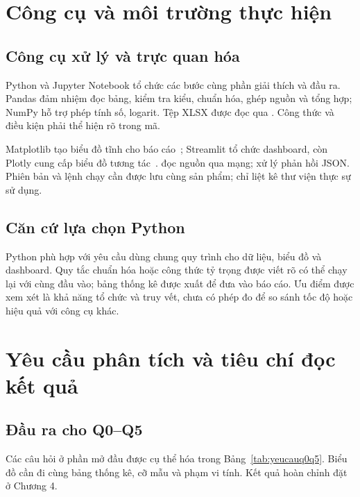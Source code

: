 \documentclass[12pt,a4paper,oneside]{report}
\newcommand{\tenCot}[1]{\texttt{\detokenize{#1}}}
\begin{document}
\section{Công cụ và môi trường thực hiện}
\label{sec:congcu}

\subsection{Công cụ xử lý và trực quan hóa}

Python và Jupyter Notebook tổ chức các bước cùng phần giải thích và đầu ra. Pandas đảm nhiệm đọc bảng, kiểm tra kiểu, chuẩn hóa, ghép nguồn và tổng hợp; NumPy hỗ trợ phép tính số, logarit. Tệp XLSX được đọc qua \tenCot{openpyxl}. Công thức và điều kiện phải thể hiện rõ trong mã.

Matplotlib tạo biểu đồ tĩnh cho báo cáo~\cite{matplotlib}; Streamlit tổ chức dashboard, còn Plotly cung cấp biểu đồ tương tác~\cite{streamlit}. \tenCot{requests} đọc nguồn qua mạng; \tenCot{json} xử lý phản hồi JSON. Phiên bản và lệnh chạy cần được lưu cùng sản phẩm; chỉ liệt kê thư viện thực sự sử dụng.

\subsection{Căn cứ lựa chọn Python}

Python phù hợp với yêu cầu dùng chung quy trình cho dữ liệu, biểu đồ và dashboard. Quy tắc chuẩn hóa hoặc công thức tỷ trọng được viết rõ có thể chạy lại với cùng đầu vào; bảng thống kê được xuất để đưa vào báo cáo. Ưu điểm được xem xét là khả năng tổ chức và truy vết, chưa có phép đo để so sánh tốc độ hoặc hiệu quả với công cụ khác.

\section{Yêu cầu phân tích và tiêu chí đọc kết quả}
\label{sec:yeucauphanTich}

\subsection{Đầu ra cho Q0--Q5}

Các câu hỏi ở phần mở đầu được cụ thể hóa trong Bảng~\ref{tab:yeucauq0q5}. Biểu đồ cần đi cùng bảng thống kê, cỡ mẫu và phạm vi tính. Kết quả hoàn chỉnh đặt ở Chương 4.
\end{document}
